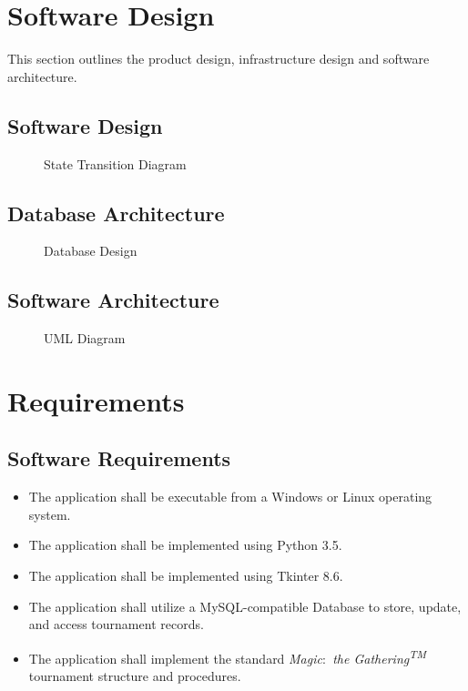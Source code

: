 \documentclass[11pt]{article}
\newcommand{\mtg}{\textit{Magic$\colon$ the Gathering\textsuperscript{TM}} }
\begin{document}
    \newpage

    \newpage

    \section{Software Design}
        This section outlines the product design, infrastructure design and software architecture.
        \subsection{Software Design}
            \begin{figure}[H]
                \caption{State Transition Diagram}
            \end{figure}
            \subsection{Database Architecture}
            \begin{figure}[H]
                \caption{Database Design}
            \end{figure}
            \subsection{Software Architecture}
             \begin{figure}[H]
                \caption{UML Diagram}
            \end{figure}

    \newpage

    \newpage

    \section{Requirements}
    \subsection{Software Requirements}
    \begin{itemize}
        \item The application shall be executable from a Windows or Linux operating system.
        \item The application shall be implemented using Python 3.5.
        \item The application shall be implemented using Tkinter 8.6.
        \item The application shall utilize a MySQL-compatible Database to store, update, and access tournament records.
        \item The application shall implement the standard \mtg tournament structure and procedures.
    \end{itemize}
\end{document}
